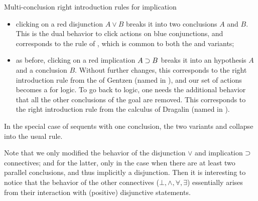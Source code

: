 \begin{marginfigure}
  \caption{Multi-conclusion right introduction rules for implication}
\end{marginfigure}

\begin{itemize}
  \item clicking on a red disjunction $A \lor B$ breaks it into two conclusions
  $A$ and $B$. This is the dual behavior to click actions on blue conjunctions,
  and corresponds to the {} rule of , which is
  common to both the  and  variants;
  \item as before, clicking on a red implication $A \supset B$ breaks it into an
  hypothesis $A$ and a conclusion $B$. Without further changes, this corresponds
  to the right introduction rule from the    of
  Gentzen (named {} in ), and
  our set of actions becomes a  for  logic. To go back to
   logic, one needs the additional behavior that all the other
  conclusions of the goal are removed. This corresponds to the right
  introduction rule from the  calculus of Dragalin (named
  {} in ).
\end{itemize}

\begin{remark}
  In the special case of  sequents with one conclusion, the two
  variants {} and {} collapse into the usual
  {} rule.
\end{remark}
Note that we only modified the behavior of the disjunction $\lor$ and
implication $\supset$ connectives; and for the latter, only in the case when there
are at least two parallel conclusions, and thus implicitly a disjunction. Then
it is interesting to notice that the  behavior of the other connectives
($\bot, \land, \forall, \exists$) essentially arises from their interaction with
(positive) disjunctive statements.

